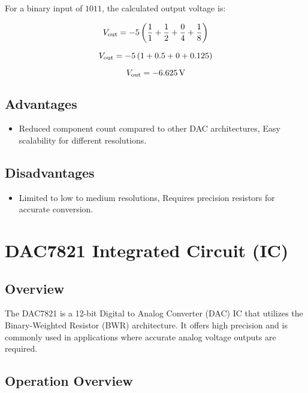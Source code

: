 \documentclass{article}
\begin{document}
For a binary input of \(1011\), the calculated output voltage is:

\[\fontsize{10}{6}\selectfont
V_{\text{out}} = -5 \left( \frac{1}{1} + \frac{1}{2} + \frac{0}{4} + \frac{1}{8} \right)
\]

\[\fontsize{10}{6}\selectfont
V_{\text{out}} = -5 \left( 1 + 0.5 + 0 + 0.125 \right)
\]

\[\fontsize{10}{6}\selectfont
V_{\text{out}} = -6.625 \, \text{V}
\]
\subsection{Advantages}

\begin{itemize}
    \item Reduced component count compared to other DAC architectures, Easy scalability for different resolutions.
\end{itemize}

\subsection{Disadvantages}

\begin{itemize}
    \item Limited to low to medium resolutions, Requires precision resistors for accurate conversion.
\end{itemize}
\newpage

\section{DAC7821 Integrated Circuit (IC)}
\fontsize{14}{16}\selectfont

\subsection{Overview}

The DAC7821 is a 12-bit Digital to Analog Converter (DAC) IC that utilizes the Binary-Weighted Resistor (BWR) architecture. It offers high precision and is commonly used in applications where accurate analog voltage outputs are required.

\subsection{Operation Overview}
\end{document}
